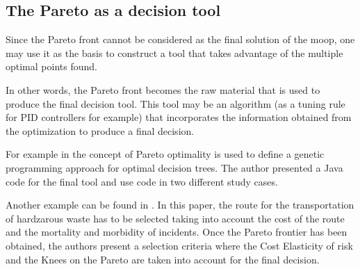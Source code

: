 \subsection{The Pareto as a decision tool}
\label{sec:ParetoData}
%
Since the Pareto front cannot be considered as the final solution of the \gls{moop}, one may use it as the basis to construct a tool that takes advantage of the multiple optimal points found.

In other words, the Pareto front becomes the raw material that is used to produce the final decision tool. This tool may be an algorithm (as a tuning rule for PID controllers for example) that incorporates the information obtained from the optimization to produce a final decision.

For example in \cite{Zhao2007}	the concept of Pareto optimality is used to define a genetic programming approach for optimal decision trees. The author presented a Java code for the final tool and use code in two different study cases.

Another example can be found in \cite{Das2012}. In this paper, the route for the transportation of hardzarous waste has to be selected taking into account the cost of the route and the mortality and morbidity of incidents. Once the Pareto frontier has been obtained, the authors present a selection criteria where the Cost Elasticity of risk and the Knees on the Pareto are taken into account for the final decision.
%
%

